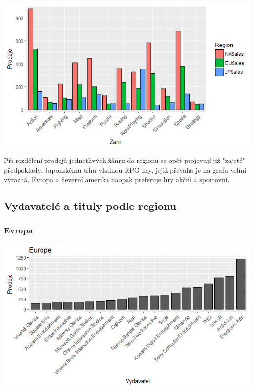 \documentclass[a4paper,11pt]{article}
\begin{document}
\includegraphics[scale=0.9]{Rplot06}

Při rozdělení prodejů jednotlivých žánru do regionu se opět projevují již "zajeté" předpoklady. Japonskému trhu vládnou RPG hry, jejiž převaha je na grafu velmi výrazná. Evropa a Severní amerika naopak preferuje hry akční a sportovní.

\newpage


\subsection{Vydavatelé a tituly podle regionu}

\subsubsection{Evropa}
\includegraphics[scale=0.8]{Rplot10}
\end{document}
